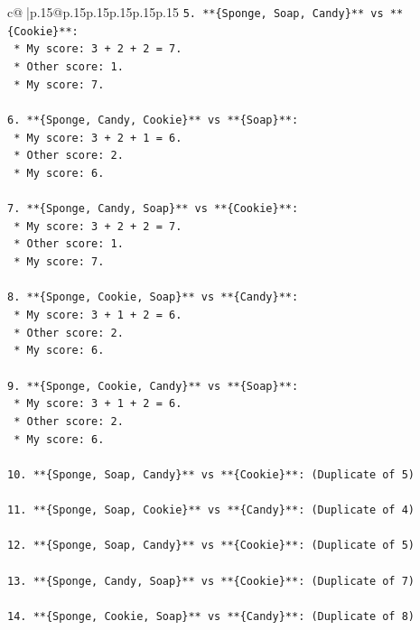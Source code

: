 \documentclass{article}
\begin{document}
{\begin{supertabular}{c@{$\;$}|p{.15\linewidth}@{}p{.15\linewidth}p{.15\linewidth}p{.15\linewidth}p{.15\linewidth}p{.15\linewidth}}
{{{\texttt{5.  **\{Sponge, Soap, Candy\}** vs **\{Cookie\}**:} \\
\texttt{    *   My score: 3 + 2 + 2 = 7.} \\
\texttt{    *   Other score: 1.} \\
\texttt{    *   My score: 7.} \\
\\ 
\texttt{6.  **\{Sponge, Candy, Cookie\}** vs **\{Soap\}**:} \\
\texttt{    *   My score: 3 + 2 + 1 = 6.} \\
\texttt{    *   Other score: 2.} \\
\texttt{    *   My score: 6.} \\
\\ 
\texttt{7.  **\{Sponge, Candy, Soap\}** vs **\{Cookie\}**:} \\
\texttt{    *   My score: 3 + 2 + 2 = 7.} \\
\texttt{    *   Other score: 1.} \\
\texttt{    *   My score: 7.} \\
\\ 
\texttt{8.  **\{Sponge, Cookie, Soap\}** vs **\{Candy\}**:} \\
\texttt{    *   My score: 3 + 1 + 2 = 6.} \\
\texttt{    *   Other score: 2.} \\
\texttt{    *   My score: 6.} \\
\\ 
\texttt{9.  **\{Sponge, Cookie, Candy\}** vs **\{Soap\}**:} \\
\texttt{    *   My score: 3 + 1 + 2 = 6.} \\
\texttt{    *   Other score: 2.} \\
\texttt{    *   My score: 6.} \\
\\ 
\texttt{10. **\{Sponge, Soap, Candy\}** vs **\{Cookie\}**: (Duplicate of 5)} \\
\\ 
\texttt{11. **\{Sponge, Soap, Cookie\}** vs **\{Candy\}**: (Duplicate of 4)} \\
\\ 
\texttt{12. **\{Sponge, Soap, Candy\}** vs **\{Cookie\}**: (Duplicate of 5)} \\
\\ 
\texttt{13. **\{Sponge, Candy, Soap\}** vs **\{Cookie\}**: (Duplicate of 7)} \\
\\ 
\texttt{14. **\{Sponge, Cookie, Soap\}** vs **\{Candy\}**: (Duplicate of 8)} \\
}}}
\end{supertabular}}
\end{document}
